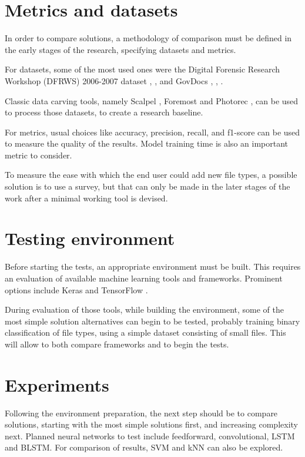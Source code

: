 \section{Metrics and datasets}

In order to compare solutions, a methodology of comparison must be defined in the early stages of the research, specifying datasets and metrics.

For datasets, some of the most used ones were the Digital Forensic Research Workshop (DFRWS) 2006-2007 dataset \cite{qiu_new_2014}, \cite{ali_review_2018}, and GovDocs \cite{hiester_file_2018}, \cite{fitzgerald_using_2012}, \cite{beebe_sceadan:_2013}.

Classic data carving tools, namely Scalpel \cite{richard_iii_scalpel:_2005}, Foremost \cite{kendall_foremost_2019} and Photorec \cite{grenier_photorec_2019}, can be used to process those datasets, to create a research baseline.

For metrics, usual choices like accuracy, precision, recall, and f1-score can be used to measure the quality of the results. Model training time is also an important metric to consider.

To measure the ease with which the end user could add new file types, a possible solution is to use a survey, but that can only be made in the later stages of the work after a minimal working tool is devised.


\section{Testing environment}
Before starting the tests, an appropriate environment must be built. This requires an evaluation of available machine learning tools and frameworks. Prominent options include Keras \cite{chollet_keras_2019} and TensorFlow \cite{google_brain_tensorflow_2019}.

During evaluation of those tools, while building the environment, some of the most simple solution alternatives can begin to be tested, probably training binary classification of file types, using a simple dataset consisting of small files. This will allow to both compare frameworks and to begin the tests.

\section{Experiments}
Following the environment preparation, the next step should be to compare solutions, starting with the most simple solutions first, and increasing complexity next. Planned neural networks to test include feedforward, convolutional, LSTM and BLSTM. For comparison of results, SVM and kNN can also be explored.

